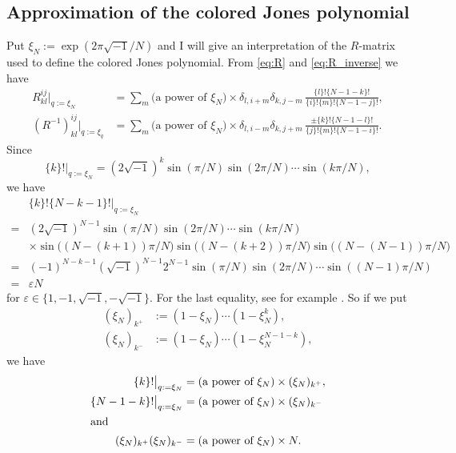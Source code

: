 \documentclass{amsart}
\theoremstyle{definition}
\theoremstyle{remark}
\numberwithin{equation}{section}
\begin{document}
\subsection{Approximation of the colored Jones polynomial}
Put $\xi_N:=\exp(2\pi\sqrt{-1}/N)$ and I will give an interpretation of the $R$-matrix used to define the colored Jones polynomial.
From \eqref{eq:R} and \eqref{eq:R_inverse} we have
\begin{equation}\label{eq:R_N}
\begin{split}
  R^{ij}_{kl}\bigr|_{q:=\xi_N}
  &=
  \sum_{m}
  \text{(a power of $\xi_N$)}\times
  \delta_{l,i+m}\delta_{k,j-m}\,
  \frac{\{l\}!\{N-1-k\}!}{\{i\}!\{m\}!\{N-1-j\}!},
  \\
  (R^{-1})^{ij}_{kl}\bigr|_{q:=\xi_q}
  &=
  \sum_{m}
  \text{(a power of $\xi_N$)}\times
  \delta_{l,i-m}\delta_{k,j+m}\,
  \frac{\pm\{k\}!\{N-1-l\}!}{\{j\}!\{m\}!\{N-1-i\}!}.
\end{split}
\end{equation}
Since
\begin{equation*}
  \{k\}!\bigr|_{q:=\xi_N}
  =
  \left(2\sqrt{-1}\right)^{k}
  \sin(\pi/N)
  \sin(2\pi/N)
  \cdots
  \sin(k\pi/N),
\end{equation*}
we have
\begin{equation*}
\begin{split}
  &
  \{k\}!\{N-k-1\}!\bigr|_{q:=\xi_N}
  \\
  =&
  \left(2\sqrt{-1}\right)^{N-1}
  \sin(\pi/N)\sin(2\pi/N)\cdots\sin(k\pi/N)
  \\
  &\times
  \sin\bigl((N-(k+1))\pi/N\bigr)
  \sin\bigl((N-(k+2))\pi/N\bigr)
  \sin\bigl((N-(N-1))\pi/N\bigr)
  \\
  =&
  (-1)^{N-k-1}\left(\sqrt{-1}\right)^{N-1}
  2^{N-1}
  \sin(\pi/N)\sin(2\pi/N)\cdots\sin((N-1)\pi/N)
  \\
  =&
  \varepsilon N
\end{split}
\end{equation*}
for $\varepsilon\in\{1,-1,\sqrt{-1},-\sqrt{-1}\}$.
For the last equality, see for example \cite{Murakami/Murakami:ACTAM12001}.
So if we put
\begin{align*}
  (\xi_N)_{k^+}&:=(1-\xi_N)\cdots(1-\xi^k_N),
  \\
  (\xi_N)_{k^{-}}&:=(1-\xi_N)\cdots(1-\xi^{N-1-k}_N),
\end{align*}
we have
\begin{align*}
  \{k\}!\bigr|_{q:=\xi_N}
  &=
  \text{(a power of $\xi_N$)}\times(\xi_N)_{k^+},
  \\
  \{N-1-k\}!\bigr|_{q:=\xi_N}
  &=
  \text{(a power of $\xi_N$)}\times(\xi_N)_{k^-}
  \\
  \intertext{and}
  (\xi_N)_{k^+}(\xi_N)_{k^-}
  &=
  \text{(a power of $\xi_N$)}\times N.
\end{align*}
\end{document}
